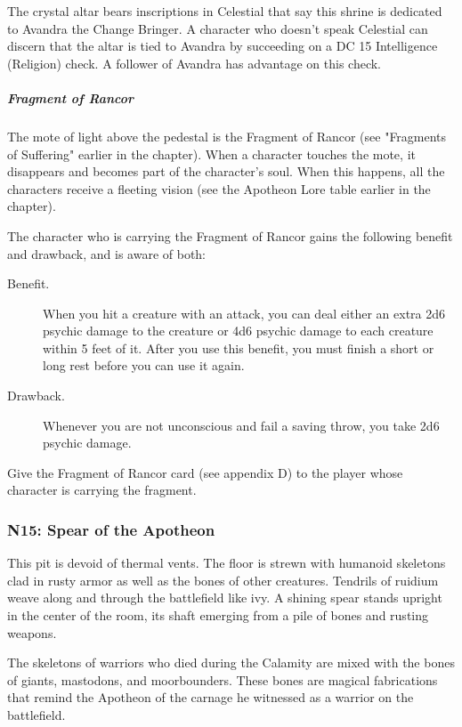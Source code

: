 \documentclass[10pt,a4paper,twoside,fancy,bg=print,twocolumn,openany,nodeprecatedcode]{dndbook}
\begin{document}
The crystal altar bears inscriptions in Celestial that say this shrine is dedicated to Avandra the Change Bringer. A character who doesn't speak Celestial can discern that the altar is tied to Avandra by succeeding on a DC 15 Intelligence (Religion) check. A follower of Avandra has advantage on this check.

\subparagraph{Fragment of Rancor}
The mote of light above the pedestal is the Fragment of Rancor (see "Fragments of Suffering" earlier in the chapter). When a character touches the mote, it disappears and becomes part of the character's soul. When this happens, all the characters receive a fleeting vision (see the Apotheon Lore table earlier in the chapter).

The character who is carrying the Fragment of Rancor gains the following benefit and drawback, and is aware of both:



\begin{description}
\item[Benefit.]
When you hit a creature with an attack, you can deal either an extra 2d6 psychic damage to the creature or 4d6 psychic damage to each creature within 5 feet of it. After you use this benefit, you must finish a short or long rest before you can use it again.
\item[Drawback.]
Whenever you are not unconscious and fail a saving throw, you take 2d6 psychic damage.
\end{description}





Give the Fragment of Rancor card (see appendix D) to the player whose character is carrying the fragment.

\subsubsection{N15: Spear of the Apotheon}
\begin{DndReadAloud}{}
This pit is devoid of thermal vents. The floor is strewn with humanoid skeletons clad in rusty armor as well as the bones of other creatures. Tendrils of ruidium weave along and through the battlefield like ivy. A shining spear stands upright in the center of the room, its shaft emerging from a pile of bones and rusting weapons.

\end{DndReadAloud}

The skeletons of warriors who died during the Calamity are mixed with the bones of giants, mastodons, and moorbounders. These bones are magical fabrications that remind the Apotheon of the carnage he witnessed as a warrior on the battlefield.
\end{document}
